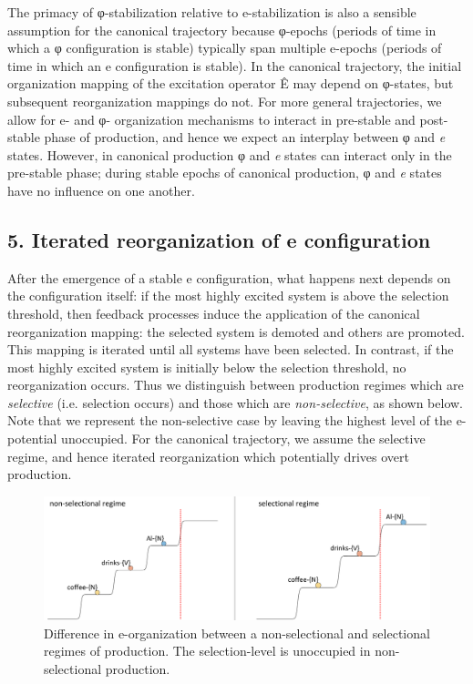   The primacy of φ-stabilization relative to e-stabilization is also a sensible assumption for the canonical trajectory because φ-epochs (periods of time in which a φ configuration is stable) typically span multiple e-epochs (periods of time in which an e configuration is stable). In the canonical trajectory, the initial organization mapping of the excitation operator Ê may depend on φ-states, but subsequent reorganization mappings do not. For more general trajectories, we allow for e- and φ- organization mechanisms to interact in pre-stable and post-stable phase of production, and hence we expect an interplay between φ and \textit{e} states. However, in canonical production φ and \textit{e} states can interact only in the pre-stable phase; during stable epochs of canonical production, φ and \textit{e} states have no influence on one another. 

\subsection{5. Iterated reorganization of e configuration}

After the emergence of a stable e configuration, what happens next depends on the configuration itself: if the most highly excited system is above the selection threshold, then feedback processes induce the application of the canonical reorganization mapping: the selected system is demoted and others are promoted. This mapping is iterated until all systems have been selected. In contrast, if the most highly excited system is initially below the selection threshold, no reorganization occurs. Thus we distinguish between production regimes which are \textit{selective} (i.e. selection occurs) and those which are \textit{non-selective}, as shown below. Note that we represent the non-selective case by leaving the highest level of the e-potential unoccupied. For the canonical trajectory, we assume the selective regime, and hence iterated reorganization which potentially drives overt production. 

  
\begin{figure}
\includegraphics[width=\textwidth]{figures/Tilsen-img53.png}
\caption{Difference in e-organization between a non-selectional and selectional regimes of production. The selection-level is unoccupied in non-selectional production.}
\label{fig:4:3}
\end{figure}
 

